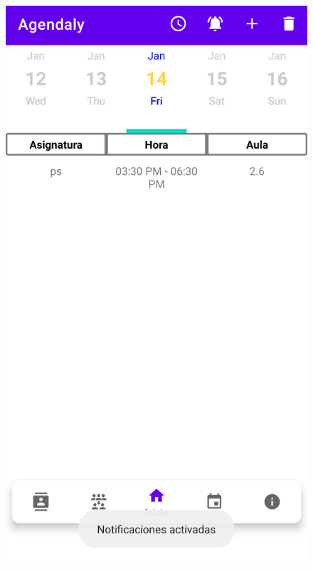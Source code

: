\documentclass[a4paper,openright,12pt]{article}
\begin{document}
\begin{figure}
        \includegraphics[scale=0.05]{notificacion2.png} 

\end{figure}
\end{document}
